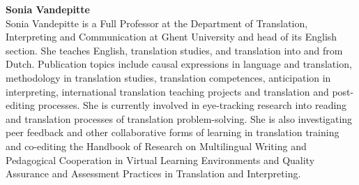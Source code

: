 \medskip\noindent
\textbf{Sonia Vandepitte }\\
Sonia Vandepitte is a Full Professor at the Department of Translation, Interpreting and Communication at Ghent University and head of its English section. She teaches English, translation studies, and translation into and from Dutch. Publication topics include causal expressions in language and translation, methodology in translation studies, translation competences, anticipation in interpreting, international translation teaching projects and translation and post-editing processes. She is currently involved in eye-tracking research into reading and translation processes of translation problem-solving. She is also investigating peer feedback and other collaborative forms of learning in translation training and co-editing the Handbook of Research on Multilingual Writing and Pedagogical Cooperation in Virtual Learning Environments and Quality Assurance and Assessment Practices in Translation and Interpreting.